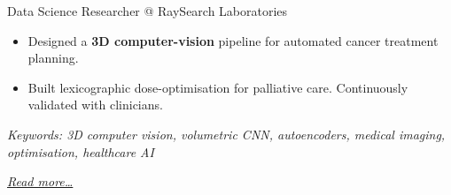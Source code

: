 \large{Data Science Researcher @ RaySearch Laboratories}

\normalsize
\begin{itemize}
    \item Designed a \textbf{3D computer-vision} pipeline for automated cancer treatment planning.
    \item Built lexicographic dose-optimisation for palliative care. Continuously validated with clinicians.
\end{itemize}

{\footnotesize\textit{Keywords: 3D computer vision, volumetric CNN, autoencoders, medical imaging, optimisation, healthcare AI}}

\hfill{\small{\textit{\hyperref[sec:raysearch]{Read more…}}}}

